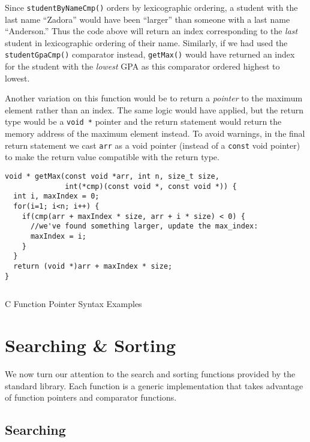 Since \texttt{studentByNameCmp()} orders by lexicographic ordering, 
a student with the last name ``Zadora'' would have been ``larger'' than 
someone with a last name ``Anderson.''  Thus the code above will return 
an index corresponding to the \emph{last} student in lexicographic ordering
of their name.  Similarly, if we had used the \texttt{studentGpaCmp()} comparator instead, \texttt{getMax()} would have returned an index for the
student with the \emph{lowest} GPA as this comparator ordered highest to
lowest.

Another variation on this function would be to return a \emph{pointer}
to the maximum element rather than an index.  The same logic would have
applied, but the return type would be a \texttt{void *} pointer
and the return statement would return the memory address of the maximum
element instead.  To avoid warnings, in the final return statement we
cast \texttt{arr} as a void pointer (instead of a 
\texttt{const} void pointer) to make the return value compatible
with the return type.

\begin{verbatim}
void * getMax(const void *arr, int n, size_t size, 
              int(*cmp)(const void *, const void *)) {
  int i, maxIndex = 0;
  for(i=1; i<n; i++) {
    if(cmp(arr + maxIndex * size, arr + i * size) < 0) {
      //we've found something larger, update the max_index:
      maxIndex = i;
    }
  }
  return (void *)arr + maxIndex * size;
}
\end{verbatim}

\begin{listing}[H]
\inputminted[fontsize=\scriptsize]{c}{code/functionPointers.c}
\caption{C Function Pointer Syntax Examples}
\label{code:c:moreFunctionPointerSyntax}
\end{listing}

\section{Searching \& Sorting}

We now turn our attention to the search and sorting functions provided by
the standard library.  Each function is a generic implementation
that takes advantage of function pointers and comparator functions.

\subsection{Searching}

